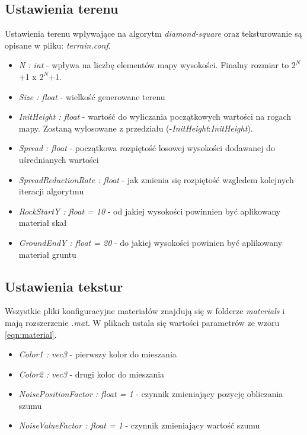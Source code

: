 \documentclass[inz,longabstract]{iithesis}
\begin{document}
        \subsection{Ustawienia terenu}
        Ustawienia terenu wpływające na algorytm \textit{diamond-square} oraz teksturowanie są opisane w pliku: \textit{terrain.conf}.
        \begin{itemize}
            \item \textit{N : int} - wpływa na liczbę elementów mapy wysokości. Finalny rozmiar to $2^N$+1 x $2^N$+1.
            \item \textit{Size : float} - wielkość generowane terenu 
            \item \textit{InitHeight : float} - wartość do wyliczania początkowych wartości na rogach mapy. Zostaną wylosowane z przedziału (-\textit{InitHeight}:\textit{InitHeight}).
            \item \textit{Spread : float} - początkowa rozpiętość losowej wysokości dodawanej do uśrednianych wartości
            \item \textit{SpreadReductionRate : float} - jak zmienia się rozpiętość wzgledem kolejnych iteracji algorytmu 
            \item \textit{RockStartY : float = 10} - od jakiej wysokości powinnien być aplikowany materiał skał
            \item \textit{GroundEndY : float = 20} - do jakiej wysokości powinien być aplikowany materiał gruntu
        \end{itemize}
        
        \subsection{Ustawienia tekstur}
        Wszystkie pliki konfiguracyjne materiałów znajdują się w folderze \textit{materials} i mają rozszerzenie \textit{.mat}. W plikach ustala się wartości parametrów ze wzoru \ref{eqn:material}. 
        \begin{itemize}
            \item \textit{Color1 : vec3} - pierwszy kolor do mieszania
            \item \textit{Color2 : vec3} - drugi kolor do mieszania
            \item \textit{NoisePositionFactor : float = 1} - czynnik zmieniający pozycję obliczania szumu 
            \item \textit{NoiseValueFactor : float = 1} - czynnik zmieniający wartość szumu
        \end{itemize}
        
\end{document}
